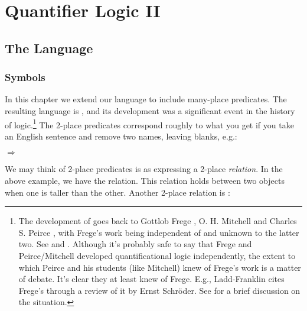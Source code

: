 
\chapter{Quantifier Logic II}\label{quantifierlogic}

\section{The Language \GQL{}}


\subsection{Symbols}\label{Sec:GQLSymbols}
In this chapter we extend our language to include many-place predicates.  The resulting language is \GQL{}, and its development was a significant event in the history of logic.\footnote{%
	The development of \GQL{} goes back to Gottlob Frege \citeyearpar{Frege1879,Frege1891,Frege1893}, O. H. Mitchell \citeyearpar{Mitchell1883} and Charles S. Peirce \citeyearpar{Peirce1883}, with Frege's work being independent of and unknown to the latter two. See \citealp[288]{Church1956} and \citealp[34]{Hodges2001}.  %
 Although it's probably safe to say that Frege and Peirce/Mitchell developed quantificational logic independently, the extent to which Peirce and his students (like Mitchell) knew of Frege's work is a matter of debate.
It's clear they at least knew of Frege.
E.g., Ladd-Franklin \citeyearpar{LaddFranklin1883} cites Frege's \citeyearpar{Frege1879} through a review of it by Ernst Schr\"oder. 
See \citep{Dipert1984} for a brief discussion on the situation.}
The 2-place predicates correspond roughly to what you get if you take an English sentence and remove two names, leaving blanks, e.g.:

\begin{RESTARTmenumerate}
	\item {} $\Rightarrow$ 
\end{RESTARTmenumerate}

\noindent{}We may think of 2-place predicates is as expressing a 2-place \emph{relation}.  In the above example, we have the  relation.  This relation holds between two objects when one is taller than the other.  Another 2-place relation is :

